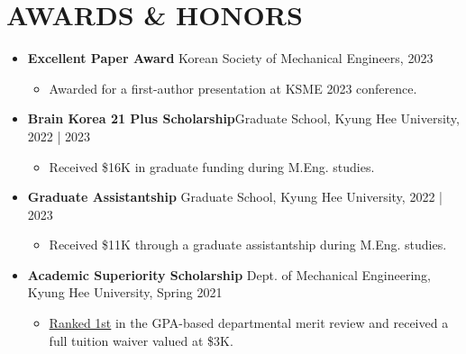 \documentclass[a4paper,10pt]{extarticle}
\begin{document}
\section*{AWARDS \& HONORS}
\begin{itemize}
	\item \textbf{Excellent Paper Award} \hfill Korean Society of Mechanical Engineers, 2023 %
		      {\small
			      \vspace*{-0.2cm}
			      \begin{itemize}
				      \item Awarded for a first-author presentation at KSME 2023 conference.
			      \end{itemize}}
	      \vspace*{-0.2cm}
	\item \textbf{Brain Korea 21 Plus Scholarship}\hfill Graduate School, Kyung Hee University, 2022 | 2023 %
	{\small
			      \vspace*{-0.2cm}
			      \begin{itemize}
				      \item Received \$16K in graduate funding during M.Eng. studies.
			      \end{itemize}}
	      \vspace*{-0.2cm}
	\item \textbf{Graduate Assistantship} \hfill Graduate School, Kyung Hee University, 2022 | 2023 %
		      {\small
			      \vspace*{-0.2cm}
			      \begin{itemize}
					\item Received \$11K through a graduate assistantship during M.Eng. studies.
			      \end{itemize}}
	      \vspace*{-0.2cm}
	\item \textbf{Academic Superiority Scholarship} \hfill Dept. of Mechanical Engineering, Kyung Hee University, Spring 2021 %
		      {\small
			      \vspace*{-0.2cm}
			      \begin{itemize}
					\item \ul{Ranked 1st} in the GPA-based departmental merit review and received a full tuition waiver valued at \$3K.
			      \end{itemize}}
\end{itemize}
\end{document}
